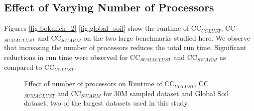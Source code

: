 \documentclass[10pt, conference, compsocconf]{IEEEtran}
\begin{document}
\subsection{\textbf{Effect of Varying Number of Processors}}
Figures \ref{fig:bokulich_2}-\ref{fig:global_soil} show the 
runtime of CC$_{UCLUST}$, CC$_{SUMACLUST}$ and CC$_{SWARM}$ on the 
two large 
benchmarks studied here. We observe that 
increasing the number of processors reduces the 
total run time. Significant reductions in run time were 
observed for CC$_{SUMACLUST}$ and CC$_{SWARM}$ as 
compared to CC$_{UCLUST}$.  


\begin{figure}[t]	
	\begin{minipage}[t]{0.5\linewidth}
	\end{minipage}%
	\hfill%
	\begin{minipage}[t]{0.5\linewidth}
	\end{minipage}	
	\caption{Effect of number of processors on Runtime of CC$_{UCLUST}$, CC$_{SUMACLUST}$ and CC$_{SWARM}$ for 30M sampled dataset and Global Soil dataset, two of the largest datasets used in this study.}
\end{figure}
\end{document}
